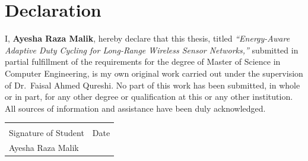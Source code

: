\chapter*{Declaration}
\thispagestyle{plain}

\noindent I, \textbf{Ayesha Raza Malik}, hereby declare that this thesis, titled
\emph{``Energy-Aware Adaptive Duty Cycling for Long-Range Wireless Sensor Networks,''}
submitted in partial fulfillment of the requirements for the degree of Master of Science in
Computer Engineering, is my own original work carried out under the supervision of
Dr.\ Faisal Ahmed Qureshi. No part of this work has been submitted, in whole or in part, for
any other degree or qualification at this or any other institution. All sources of information
and assistance have been duly acknowledged.

\vspace{50pt}

\begin{tabular}{@{}p{7cm}p{7cm}@{}}
\dotfill & \dotfill \\
Signature of Student & Date \\[4pt]
Ayesha Raza Malik &  \\
\end{tabular}

